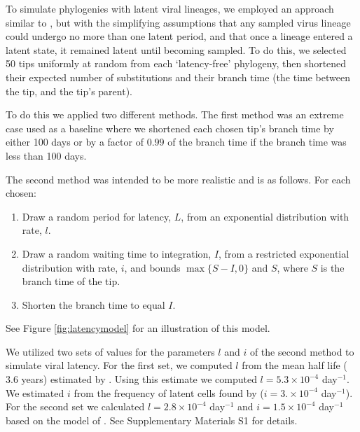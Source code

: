 \documentclass[12pt]{article}
\begin{document}

To simulate phylogenies with latent viral lineages, we employed an approach similar to \citet{Immonen14}, but with the simplifying assumptions that any sampled virus lineage could undergo no more than one latent period, and that once a lineage entered a latent state, it remained latent until becoming sampled.
To do this, we selected 50 tips uniformly at random from each `latency-free' phylogeny, then shortened their expected number of substitutions and their branch time (the time between the tip, and the tip's parent).

To do this we applied two different methods.
The first method was an extreme case used as a baseline where we shortened each chosen tip's branch time by either 100 days or by a factor of $0.99$ of the branch time if the branch time was less than 100 days.

The second method was intended to be more realistic and is as follows. For each chosen:
\begin{enumerate}
\item Draw a random period for latency, $L$, from an exponential distribution with rate, $l$.
\item Draw a random waiting time to integration, $I$, from a restricted exponential distribution with rate, $i$, and bounds $\max\{S-I, 0\}$ and $S$, where $S$ is the branch time of the tip.
\item Shorten the branch time to equal $I$.
\end{enumerate}
See Figure \ref{fig:latencymodel} for an illustration of this model.

We utilized two sets of values for the parameters $l$ and $i$ of the second method to simulate viral latency.
For the first set, we computed $l$ from the mean half life ($3.6$ years) estimated by \cite{Crooks15}.
Using this estimate we computed $l = 5.3 \times 10^{-4}$ day$^{-1}$.
We estimated $i$ from the frequency of latent cells found by \cite{Ho13} ($i = 3. \times 10^{-4}$ day$^{-1}$).
For the second set we calculated $l = 2.8 \times 10^{-4}$ day$^{-1}$ and $i = 1.5 \times 10^{-4}$ day$^{-1}$ based on the model of \cite{Kim06}.
See Supplementary Materials S1 for details.
\end{document}
